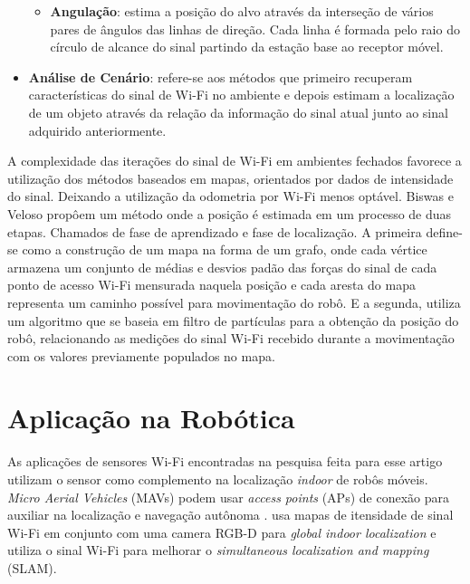 \begin{itemize}
\begin{itemize}
        \item \textbf{Angulação}: estima a posição do alvo através da interseção de vários pares de
        ângulos das linhas de direção. Cada linha é formada pelo raio do círculo de alcance
        do sinal partindo da estação base ao receptor móvel.

    \end{itemize}

    \item \textbf{Análise de Cenário}: refere-se aos métodos que primeiro recuperam características do sinal de Wi-Fi no ambiente e depois estimam a localização de um objeto através da relação da informação do sinal atual junto ao sinal adquirido anteriormente. 

\end{itemize}

A complexidade das iterações do sinal de Wi-Fi em ambientes fechados favorece a utilização dos métodos baseados em mapas, orientados por dados de intensidade do sinal.
Deixando a utilização da odometria por Wi-Fi menos optável. Biswas e Veloso propôem um método onde a posição é estimada em um processo de duas etapas. Chamados de fase de aprendizado e fase de localização.
A primeira define-se como a construção de um mapa na forma de um grafo, onde cada vértice armazena um conjunto de médias e desvios padão das forças do sinal de cada ponto de acesso Wi-Fi mensurada naquela posição e cada aresta do mapa representa um caminho possível para movimentação do robô.
E a segunda, utiliza um algoritmo que se baseia em filtro de partículas para a obtenção da posição do robô, relacionando as medições do sinal Wi-Fi recebido durante a movimentação com os valores previamente populados no mapa.\cite{Biswas2010}

\section{Aplicação na Robótica}
\label{sec:ass1} 
As aplicações de sensores Wi-Fi encontradas na pesquisa feita para esse artigo utilizam o sensor como complemento na localização \textit{indoor} de robôs móveis. 
\textit{Micro Aerial Vehicles} (MAVs) podem usar \textit{access points} (APs) de conexão para auxiliar na localização e navegação autônoma \cite{Zhang2020}.
\cite{Ito2014} usa mapas de itensidade de sinal Wi-Fi em conjunto com uma camera RGB-D para \textit{global indoor localization} e \cite{Kudo2017}
utiliza o sinal Wi-Fi para melhorar o \textit{simultaneous localization and mapping} (SLAM).

